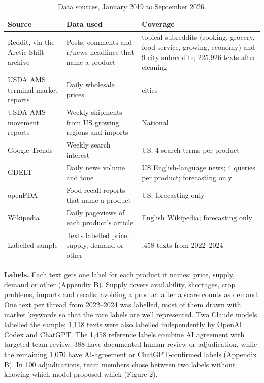 \documentclass[
  11pt,
]{article}
\begin{document}
\begin{table}[htbp]
\centering\small
\caption{Data sources, January 2019 to September 2026.}
\begin{tabularx}{\linewidth}{>{\RaggedRight\arraybackslash\hsize=0.8\hsize}X>{\RaggedRight\arraybackslash\hsize=0.95\hsize}X>{\RaggedRight\arraybackslash\hsize=1.25\hsize}X}
\toprule
Source & Data used & Coverage \\
\midrule
Reddit, via the Arctic Shift archive & Posts, comments and r/news headlines that name a product & 29 topical subreddits (cooking, grocery, food service, growing, economy) and 9 city subreddits; 225,926 texts after cleaning \\
USDA AMS terminal market reports & Daily wholesale prices & 10 cities \\
USDA AMS movement reports & Weekly shipments from US growing regions and imports & National \\
Google Trends & Weekly search interest & US; 4 search terms per product \\
GDELT & Daily news volume and tone & US English-language news; 4 queries per product; forecasting only \\
openFDA & Food recall reports that name a product & US; forecasting only \\
Wikipedia & Daily pageviews of each product's article & English Wikipedia; forecasting only \\
Labelled sample & Texts labelled price, supply, demand or other & 1,458 texts from 2022--2024 \\
\bottomrule
\end{tabularx}
\end{table}

\textbf{Labels.} Each text gets one label for each product it names:
price, supply, demand or other (Appendix B). Supply covers availability,
shortages, crop problems, imports and recalls; avoiding a product after
a scare counts as demand. One text per thread from 2022--2024 was
labelled, most of them drawn with market keywords so that the rare
labels are well represented. Two Claude models labelled the sample; 1,118 texts were also labelled
independently by OpenAI Codex and ChatGPT. The 1,458 reference labels
combine AI agreement with targeted team review: 388 have documented human
review or adjudication, while the remaining 1,070 have AI-agreement or
ChatGPT-confirmed labels (Appendix B). In 100 adjudications, team members
chose between two labels without knowing which model proposed which
(Figure 2).
\end{document}
